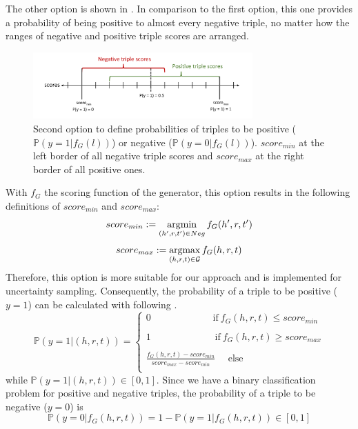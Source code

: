 The other option is shown in .
In comparison to the first option, this one provides a probability of being positive to almost every negative triple, no matter how the ranges of negative and positive triple scores are arranged.
\begin{figure}[H]
  \centering
    \includegraphics[width=0.75\textwidth]{figures/positives_negatives2.pdf}
  \caption{Second option to define probabilities of triples to be positive ($\mathds{P}(y = 1 | f_G(l))$) or negative ($\mathds{P}(y = 0 | f_G(l))$). 
  $score_{min}$ at the left border of all negative triple scores and $score_{max}$ at the right border of all positive ones.}
  \label{fig:positives_negatives2}
\end{figure}
With $f_G$ the scoring function of the generator, this option results in the following definitions of $score_{min}$ and $score_{max}$:
\begin{equation} \label{eqn:opt1_score_min}
    score_{min} := \operatorname*{argmin}_{(h',r,t') \in Neg}{f_G(h',r,t')}
\end{equation}
\begin{equation} \label{eqn:opt1_score_max}
    score_{max} := \operatorname*{argmax}_{(h,r,t) \in \mathcal{G}}{f_G(h,r,t)}
\end{equation}
Therefore, this option is more suitable for our approach and is implemented for uncertainty sampling.
Consequently, the probability of a triple to be positive ($y = 1$) can be calculated with following .
\begin{equation}  \label{eqn:positive_probability}
    \mathds{P}(y = 1|(h, r, t)) =
    \begin{cases}
        0 \ \ \ \ \ \ \ \ \ \ \ \ \ \ \ \ \ \ \ \ \ \ \ \ \ \ \  \ \   
         \text{if} \  f_G(h,r,t) \leq score_{min}
         
        \\ \\
        1 \ \ \ \ \ \ \ \ \ \ \ \ \ \ \ \ \ \ \ \ \ \ \ \ \ \ \   \ \ \
        \text{if} \ f_G(h,r,t) \geq score_{max}
         
        \\ \\
        \frac{f_G(h,r,t) - score_{min}}{score_{max} - score_{min}}
        \ \ \ \ \ \ 
         \text{else}
        \\
    \end{cases} 
\end{equation}
while $\mathds{P}(y = 1|(h, r, t))  \in [0, 1]$.
Since we have a binary classification problem for positive and negative triples, the probability of a triple to be negative ($y=0$) is
\begin{equation} \label{eqn:negative_probability}
    \mathds{P}(y = 0 | f_G(h, r, t)) = 1 - \mathds{P}(y = 1| f_G(h, r, t)) \in [0,1]
\end{equation}